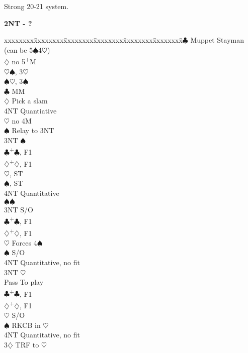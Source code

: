 \documentclass[10pt]{article}
\renewcommand{\c}{$\clubsuit$}
\renewcommand{\d}{$\diamondsuit$}
\newcommand{\h}{$\heartsuit$}
\newcommand{\s}{$\spadesuit$}
\newcommand{\p}{\textsuperscript{+}}
\newcommand{\m}{\textsuperscript{\textminus}}
\newenvironment{bidtable}[1][]
{\textbf{#1}
  \begin{adjustwidth}{1em}{}
    \addvspace{2pt}
    \begin{tabbing}
      xxxxxxxx\=xxxxxxxx\=xxxxxxxx\=xxxxxxxx\=xxxxxxxx\=xxxxxxxx\=\kill}
{\end{tabbing}\end{adjustwidth}\bigskip}%
\begin{document}
\begin{multicols*}{2}
Strong 20-21 system.

\begin{bidtable}[2NT - ?]
3\c \> Muppet Stayman (can be 5\s 4\h)                     \\
    \d \> no 5\p M                    \\
    \>     \h {}\s, 3\m\h           \\
    \>     \s {}\h, 3\m\s           \\
    \>     \c {} MM                \\
    \>     \d \> Pick a slam          \\
    \>     \> 4NT \> Quantiative          \\
    \h \> no 4M                       \\
    \>     \s \> Relay to 3NT            \\
    \>     \> 3NT \s            \\
    \>     \c {}\p\c, F1            \\
    \>     \d {}\p\d, F1            \\
    \>     \h {}, ST\\
    \>     \s {}, ST           \\
    \>     \> 4NT \> Quantitative \\
    \s {}\s                         \\
    \>     \> 3NT \> S/O            \\
    \>     \c {}\p\c, F1            \\
    \>     \d {}\p\d, F1            \\
    \>     \h \> Forces 4\s                  \\
    \>     \s \> S/O           \\
    \>     \> 4NT \> Quantitative, no fit \\
    \> 3NT \h                         \\
    \>     \> Pass \> To play           \\
    \>     \c {}\p\c, F1            \\
    \>     \d {}\p\d, F1            \\
    \>     \h \> S/O                  \\
    \>     \s \> RKCB in \h           \\
    \>     \> 4NT \> Quantitative, no fit \\
3\d \> TRF to \h                          \\

\end{bidtable}
\end{multicols*}
\end{document}
